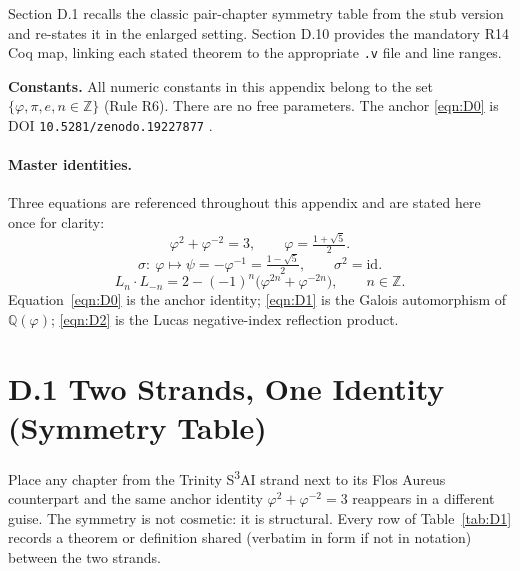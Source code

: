 Section D.1 recalls the classic pair-chapter symmetry table from the stub
version and re-states it in the enlarged setting.
Section D.10 provides the mandatory R14 Coq map, linking each stated theorem
to the appropriate \texttt{.v} file and line ranges.

\textbf{Constants.} All numeric constants in this appendix belong to the set
$\{\varphi,\pi,e,n\in\mathbb{Z}\}$ (Rule R6).  There are no free parameters.
The anchor \eqref{eqn:D0} is DOI \texttt{10.5281/zenodo.19227877}
\cite{trios_throne}.

\paragraph{Master identities.} Three equations are referenced throughout this
appendix and are stated here once for clarity:
\begin{equation}\label{eqn:D0}
  \varphi^2 + \varphi^{-2} = 3,\qquad \varphi = \tfrac{1+\sqrt{5}}{2}.
\end{equation}
\begin{equation}\label{eqn:D1}
  \sigma:\ \varphi \longmapsto \psi = -\varphi^{-1} = \tfrac{1-\sqrt{5}}{2},
  \qquad \sigma^2 = \mathrm{id}.
\end{equation}
\begin{equation}\label{eqn:D2}
  L_n \cdot L_{-n} = 2 - (-1)^n\bigl(\varphi^{2n} + \varphi^{-2n}\bigr),
  \qquad n \in \mathbb{Z}.
\end{equation}
Equation~\eqref{eqn:D0} is the anchor identity; \eqref{eqn:D1} is the Galois
automorphism of $\mathbb{Q}(\varphi)$; \eqref{eqn:D2} is the Lucas
negative-index reflection product.

\section*{D.1  Two Strands, One Identity (Symmetry Table)}

Place any chapter from the Trinity S\textsuperscript{3}AI strand next to its
Flos Aureus counterpart and the same anchor identity
$\varphi^2 + \varphi^{-2} = 3$ reappears in a different guise.
The symmetry is not cosmetic: it is structural.
Every row of Table~\ref{tab:D1} records a theorem or definition shared
(verbatim in form if not in notation) between the two strands.

